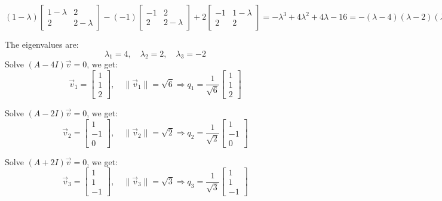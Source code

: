 \documentclass[12pt]{article}
\begin{document}
\begin{enumerate}[leftmargin=0em]
    \[(1-\lambda)
    \begin{bmatrix}
    1-\lambda & 2 \\
    2 & 2-\lambda
    \end{bmatrix}
    -(-1)
    \begin{bmatrix}
        -1 & 2 \\
        2 & 2-\lambda
    \end{bmatrix}
    +2 \begin{bmatrix}
        -1 & 1-\lambda \\
        2 & 2
    \end{bmatrix} 
    = 
    -\lambda^{3} + 4\lambda^{2}+4\lambda-16 = -(\lambda - 4)(\lambda - 2)(\lambda + 2)
    \]
    
    The eigenvalues are:
    \[
    \lambda_1 = 4, \quad \lambda_2 = 2, \quad \lambda_3 = -2
    \]
    Solve \( (A - 4I)\vec{v} = 0 \), we get:
    \[
    \vec{v}_1 = \begin{bmatrix} 1 \\ 1 \\ 2 \end{bmatrix}, \quad
    \|\vec{v}_1\| = \sqrt{6}
    \Rightarrow
    q_1 = \frac{1}{\sqrt{6}} \begin{bmatrix} 1 \\ 1 \\ 2 \end{bmatrix}
    \]
    
    Solve \( (A - 2I)\vec{v} = 0 \), we get:
    \[
    \vec{v}_2 = \begin{bmatrix} 1 \\ -1 \\ 0 \end{bmatrix}, \quad
    \|\vec{v}_2\| = \sqrt{2}
    \Rightarrow
    q_2 = \frac{1}{\sqrt{2}} \begin{bmatrix} 1 \\ -1 \\ 0 \end{bmatrix}
    \]
    
    Solve \( (A + 2I)\vec{v} = 0 \), we get:
    \[
    \vec{v}_3 = \begin{bmatrix} 1 \\ 1 \\ -1 \end{bmatrix}, \quad
    \|\vec{v}_3\| = \sqrt{3}
    \Rightarrow
    q_3 = \frac{1}{\sqrt{3}} \begin{bmatrix} 1 \\ 1 \\ -1 \end{bmatrix}
    \]
    

\end{enumerate}
\end{document}
